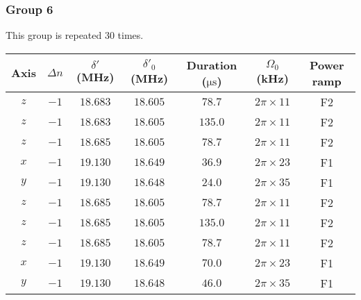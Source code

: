 \newpage
\subsubsection*{Group 6}
This group is repeated 30 times.
\begin{center}
  \begin{tabular}{|c|c|c|c|c|c|c|}
    \hline
    Axis&$\Delta n$&$\delta'$ (MHz)&$\delta'_0$ (MHz)&Duration ($\mathrm{\mu s}$)& $\Omega_0$ (kHz)&Power ramp\\\hline
    $z$&$-1$&$18.683$&$18.605$&$78.7$&$2\pi\times11$&F2\\\hline
    $z$&$-1$&$18.683$&$18.605$&$135.0$&$2\pi\times11$&F2\\\hline
    $z$&$-1$&$18.685$&$18.605$&$78.7$&$2\pi\times11$&F2\\\hline
    $x$&$-1$&$19.130$&$18.649$&$36.9$&$2\pi\times23$&F1\\\hline
    $y$&$-1$&$19.130$&$18.648$&$24.0$&$2\pi\times35$&F1\\\hline
    $z$&$-1$&$18.685$&$18.605$&$78.7$&$2\pi\times11$&F2\\\hline
    $z$&$-1$&$18.685$&$18.605$&$135.0$&$2\pi\times11$&F2\\\hline
    $z$&$-1$&$18.685$&$18.605$&$78.7$&$2\pi\times11$&F2\\\hline
    $x$&$-1$&$19.130$&$18.649$&$70.0$&$2\pi\times23$&F1\\\hline
    $y$&$-1$&$19.130$&$18.648$&$46.0$&$2\pi\times35$&F1\\\hline
  \end{tabular}
\end{center}

